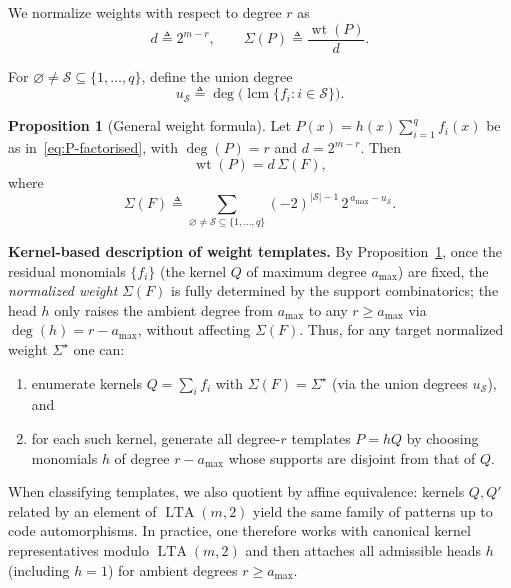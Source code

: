 \documentclass[conference]{IEEEtran}
\theoremstyle{definition}
\newtheorem{proposition}{Proposition}
\DeclareMathOperator{\LTA}{LTA}
\newcommand{\wt}{\operatorname{wt}}
\begin{document}
\noindent We normalize weights with respect to degree $r$ as
\[
d \triangleq 2^{m-r},\qquad
\Sigma(P) \triangleq \frac{\wt(P)}{d}.
\]


\noindent For $\varnothing\neq\mathcal S\subseteq\{1,\dots,q\}$, define the union degree
\[
u_{\mathcal S}\triangleq\deg\Big(\operatorname{lcm}\{f_i : i\in\mathcal S\}\Big).
\]

\begin{proposition}[General weight formula]
\label{prop:general-weight}
Let $P(x)=h(x)\sum_{i=1}^q f_i(x)$ be as in~\eqref{eq:P-factorised}, with $\deg(P)=r$ and $d=2^{m-r}$. Then
\begin{equation}
\wt(P) = d\,\Sigma(F),
\end{equation}
where
\begin{equation}
\boxed{
\Sigma(F) \triangleq
\sum_{\varnothing\neq\mathcal S\subseteq\{1,\dots,q\}}
(-2)^{|\mathcal S|-1}\,2^{\,a_{\max}-u_{\mathcal S}}.
}
\label{eq:Sigma-F}
\end{equation}
\end{proposition}



\noindent\textbf{Kernel-based description of weight templates.}
By Proposition~\ref{prop:general-weight}, once the residual monomials $\{f_i\}$ (the kernel $Q$ of
maximum degree $a_{\max}$) are fixed, the \emph{normalized weight} $\Sigma(F)$ is fully determined by
the support combinatorics; the head $h$ only raises the ambient degree from $a_{\max}$ to any
$r \ge a_{\max}$ via $\deg(h)=r-a_{\max}$, without affecting $\Sigma(F)$. Thus, for any target
normalized weight $\Sigma^\star$ one can:
\begin{enumerate}[label=(\roman*)]
  \item enumerate kernels $Q=\sum_i f_i$ with $\Sigma(F)=\Sigma^\star$ (via the union degrees $u_{\mathcal S}$), and
  \item for each such kernel, generate all degree-$r$ templates $P=hQ$ by choosing monomials $h$ of degree $r-a_{\max}$ whose supports are disjoint from that of $Q$.
\end{enumerate}
When classifying templates, we also quotient by affine equivalence: kernels $Q,Q'$ related by an
element of $\LTA(m,2)$ yield the same family of patterns up to code automorphisms. In practice, one
therefore works with canonical kernel representatives modulo $\LTA(m,2)$ and then attaches all
admissible heads $h$ (including $h=1$) for ambient degrees $r \ge a_{\max}$.
\end{document}
